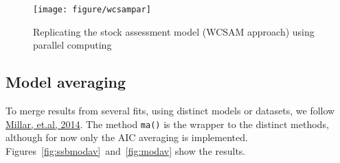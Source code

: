 \documentclass[a4paper,english,10pt]{article}\usepackage[]{graphicx}\usepackage[]{color}
\newenvironment{knitrout}{}{} %
\newcommand{\code}[1]{{\texttt{#1}}}
\begin{document}
\begin{knitrout}
\color{fgcolor}\begin{figure}[H]


{\centering \texttt{[image: figure/wcsampar]} 

}

\caption[Replicating the stock assessment model (WCSAM approach) using parallel computing]{Replicating the stock assessment model (WCSAM approach) using parallel computing\label{fig:wcsampar}}
\end{figure}


\end{knitrout}







\subsection{Model averaging}

To merge results from several fits, using distinct models or datasets, we follow \href{http://icesjms.oxfordjournals.org/content/early/2014/03/31/icesjms.fsu043.abstract}{Millar, et.al, 2014}. The method \code{ma()} is the wrapper to the distinct methods, although for now only the AIC averaging is implemented. Figures~\ref{fig:ssbmodav}~and~\ref{fig:modav} show the results. 
\end{document}

